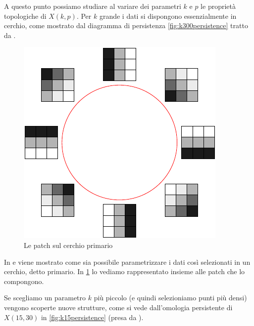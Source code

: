 A questo punto possiamo studiare al variare dei parametri $k$ e $p$ le proprietà topologiche di $X(k,p)$. Per $k$ grande i dati si dispongono essenzialmente in cerchio, come mostrato dal diagramma di persistenza \cref{fig:k300persistence} tratto da \cite{Carlsson2008}.


\begin{figure}[ht]
  \begin{center}
    \includegraphics[width=.4\linewidth]{gfx/primarycircle_labels.pdf}
    \caption{Le patch sul cerchio primario}
    \label{fig:primarycircle}
  \end{center}
\end{figure}

In \cite{Carlsson2008} e \cite{DeSilva2004} viene mostrato come sia possibile parametrizzare i dati così selezionati in un cerchio, detto primario. In \cref{fig:primarycircle} lo vediamo rappresentato insieme alle patch che lo compongono.

Se scegliamo un parametro $k$ più piccolo (e quindi selezioniamo punti più densi) vengono scoperte nuove strutture, come si vede dall'omologia persistente di $X(15,30)$ in \cref{fig:k15persistence} (presa da \cite{Carlsson2008}).

